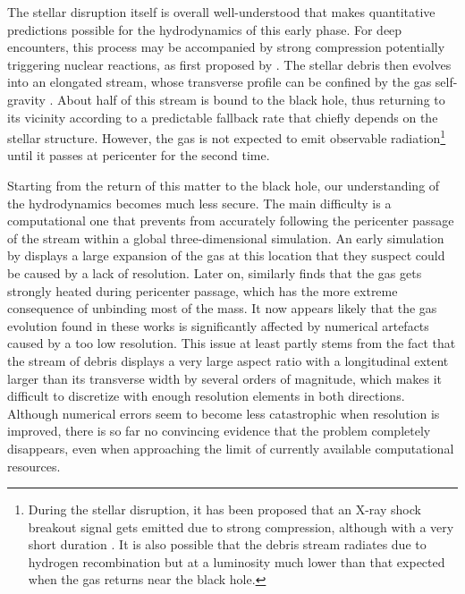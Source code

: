 \documentclass[a4paper,fleqn,usenatbib]{mnras}
\begin{document}
The stellar disruption itself is overall well-understood that makes quantitative predictions possible for the hydrodynamics of this early phase. For deep encounters, this process may be accompanied by strong compression potentially triggering nuclear reactions, as first proposed by \citet{carter1982}. The stellar debris then evolves into an elongated stream, whose transverse profile can be confined by the gas self-gravity \citep{kochanek1994,coughlin2015-variability,coughlin2016-structure,steinberg2019}. About half of this stream is bound to the black hole, thus returning to its vicinity according to a predictable fallback rate \citep{evans1989,lodato2009,guillochon2013} that chiefly depends on the stellar structure. However, the gas is not expected to emit observable radiation\footnote{During the stellar disruption, it has been proposed that an X-ray shock breakout signal gets emitted due to strong compression, although with a very short duration \citep{guillochon2009,kobayashi2004}. It is also possible that the debris stream radiates due to hydrogen recombination \citep{kasen2010} but at a luminosity much lower than that expected when the gas returns near the black hole.} until it passes at pericenter for the second time.

Starting from the return of this matter to the black hole, our understanding of the hydrodynamics becomes much less secure. The main difficulty is a computational one that prevents from accurately following the pericenter passage of the stream within a global three-dimensional simulation. An early simulation by \cite{lee1996_tvd} displays a large expansion of the gas at this location that they suspect could be caused by a lack of resolution. Later on, \cite{ayal2000} similarly finds that the gas gets strongly heated during pericenter passage, which has the more extreme consequence of unbinding most of the mass. It now appears likely that the gas evolution found in these works is significantly affected by numerical artefacts caused by a too low resolution. This issue at least partly stems from the fact that the stream of debris displays a very large aspect ratio with a longitudinal extent larger than its transverse width by several orders of magnitude, which makes it difficult to discretize with enough resolution elements in both directions. Although numerical errors seem to become less catastrophic when resolution is improved, there is so far no convincing evidence that the problem completely disappears, even when approaching the limit of currently available computational resources.
\end{document}
